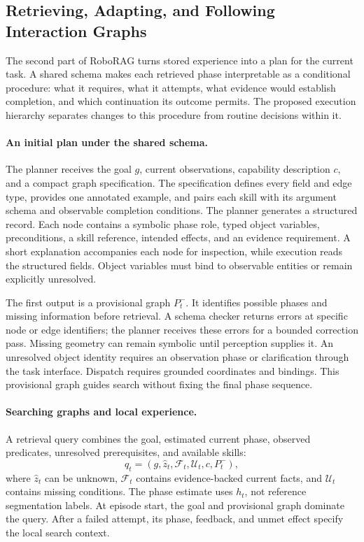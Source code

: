 \subsection{Retrieving, Adapting, and Following Interaction Graphs}
\label{sec:graph-use}

The second part of RoboRAG turns stored experience into a plan for the current task. A shared schema makes each retrieved phase interpretable as a conditional procedure: what it requires, what it attempts, what evidence would establish completion, and which continuation its outcome permits. The proposed execution hierarchy separates changes to this procedure from routine decisions within it.

\paragraph{An initial plan under the shared schema.}
The planner receives the goal $g$, current observations, capability description $c$, and a compact graph specification. The specification defines every field and edge type, provides one annotated example, and pairs each skill with its argument schema and observable completion conditions. The planner generates a structured record. Each node contains a symbolic phase role, typed object variables, preconditions, a skill reference, intended effects, and an evidence requirement. A short explanation accompanies each node for inspection, while execution reads the structured fields. Object variables must bind to observable entities or remain explicitly unresolved.

The first output is a provisional graph $P_t^{-}$. It identifies possible phases and missing information before retrieval. A schema checker returns errors at specific node or edge identifiers; the planner receives these errors for a bounded correction pass. Missing geometry can remain symbolic until perception supplies it. An unresolved object identity requires an observation phase or clarification through the task interface. Dispatch requires grounded coordinates and bindings. This provisional graph guides search without fixing the final phase sequence.

\paragraph{Searching graphs and local experience.}
A retrieval query combines the goal, estimated current phase, observed predicates, unresolved prerequisites, and available skills:
\begin{equation}
q_t=(g,\hat z_t,\mathcal F_t,\mathcal U_t,c,P_t^{-}),
\label{eq:graph-query}
\end{equation}
where $\hat z_t$ can be unknown, $\mathcal F_t$ contains evidence-backed current facts, and $\mathcal U_t$ contains missing conditions. The phase estimate uses $h_t$, not reference segmentation labels. At episode start, the goal and provisional graph dominate the query. After a failed attempt, its phase, feedback, and unmet effect specify the local search context.

